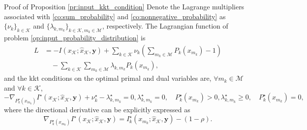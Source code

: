 \documentclass[journal]{IEEEtran}
\begin{document}
\begin{appendix}
	\begin{subsection}{Proof of Proposition \ref{pr:input_kkt_condition}}
		Denote the Lagrange multipliers associated with \eqref{co:sum_probability} and \eqref{co:nonnegative_probability} as $\{\nu_k\}_{k \in \mathcal{K}}$ and $\{\lambda_{k,m_k}\}_{k \in \mathcal{K},m_k \in \mathcal{M}}$, respectively.
		The Lagrangian function of problem \eqref{op:input_probability_distribution} is
		\begin{align}
			L
			 & = - I(x_{\mathcal{K}};\hat{x}_{\mathcal{K}},\boldsymbol{y}) + \sum_{k \in \mathcal{K}} \nu_k \left( \sum_{m_k \in \mathcal{M}} P_k(x_{m_k}) - 1 \right)\nonumber \\
			 & \quad - \sum_{k \in \mathcal{K}} \sum_{m_k \in \mathcal{M}} \lambda_{k,m_k} P_k(x_{m_k}),
		\end{align}
		and the \gls{kkt} conditions on the optimal primal and dual variables are, $\forall m_k \in \mathcal{M}$ and $\forall k \in \mathcal{K}$,
		\begin{subequations}
			\label{eq:input_kkt_condition_original}
			\begin{equation}
				- \nabla_{P_k^\star(x_{m_k})} I^\star(x_{\mathcal{K}};\hat{x}_{\mathcal{K}},\boldsymbol{y}) + \nu_k^\star - \lambda_{k,m_k}^\star = 0,
			\end{equation}
			\begin{equation}
				\lambda_{k,m_k}^\star = 0, \quad P_k^\star(x_{m_k}) > 0,
			\end{equation}
			\begin{equation}
				\lambda_{k,m_k}^\star \ge 0, \quad P_k^\star(x_{m_k}) = 0,
			\end{equation}
		\end{subequations}
		where the directional derivative can be explicitly expressed as
		\begin{equation}
			\nabla_{P_k^\star(x_{m_k})} I^\star(x_{\mathcal{K}};\hat{x}_{\mathcal{K}},\boldsymbol{y}) = I_k^\star(x_{m_k};\hat{x}_{\mathcal{K}},\boldsymbol{y}) - (1 - \rho).
			\label{eq:input_directional_derivative}
		\end{equation}


\end{subsection}
\end{appendix}
\end{document}
